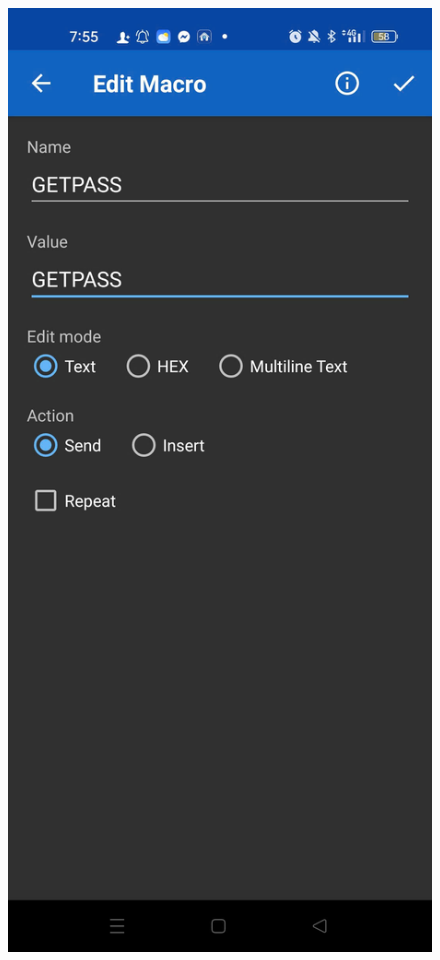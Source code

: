 \documentclass[conference, onecolumn]{IEEEtran}
\begin{document}
\begin{figure}[H]
	\vspace{0.5cm} %
	
	\begin{minipage}[b]{0.3\textwidth}
		\centering
		\includegraphics[width=\textwidth]{z6844982508852_47eb2ac8d15c7855521813a8bb1c7e7d.jpg}

\end{minipage}
\end{figure}
\end{document}
